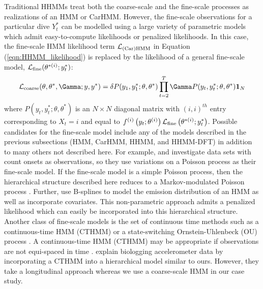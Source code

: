 Traditional HHMMs treat both the coarse-scale and the fine-scale processes as realizations of an HMM or CarHMM. 
However, the fine-scale observations for a particular dive $Y^*_t$ can be modelled using a large variety of parametric models which admit easy-to-compute likelihoods or penalized likelihoods. In this case, the fine-scale HMM likelihood term $\mathcal{L}_{\text{(Car)HMM}}$ in Equation (\ref{eqn:HHMM_likelihood}) is replaced by the likelihood of a general fine-scale model, $\mathcal{L}_{\text{fine}}(\theta^{*(i)};y^*_t)$:
\[
\calL_{\text{coarse}}(\theta,\theta^*,\Gamma;y,y^*) = \delta P(y_1,y^*_1;\theta,\theta^*) \prod_{t=2}^T \Gamma P(y_t,y^*_t;\theta,\theta^*) \mathbf{1}_N
\]
where $P(y_t,y^*_t;\theta,\theta^*) $ is an $N \times N$ diagonal matrix with $(i,i)^{th}$ entry corresponding to $X_t=i$ and equal to $f^{(i)}\left(y_t;\theta^{(i)}\right)\mathcal{L}_{\text{fine}}\left(\theta^{*(i)};y^*_t\right)$. 
%
Possible candidates for the fine-scale model include any of the models described in the previous subsections (HMM, CarHMM, HHMM, and HHMM-DFT) in addition to many others not described here. For example, \citet{Bebbington:2007} and \citet{Borchers:2013} investigate data sets with count onsets as observations, so they use variations on a Poisson process as their fine-scale model. If the fine-scale model is a simple Poisson process, then the hierarchical structure described here reduces to a Markov-modulated Poisson process \citep{Fischer:1993}.
Further, \citep{Langrock:2018} use B-splines to model the emission distribution of an HMM as well as incorporate covariates. This non-parametric approach admits a penalized likelihood which can easily be incorporated into this hierarchical structure. 
Another class of fine-scale models is the set of continuous time methods such as a continuous-time HMM (CTHMM) \citep{Liu:2015} or a state-switching Ornstein-Uhlenbeck (OU) process \citep{Michelot:2019}. 
A continuous-time HMM (CTHMM) may be appropriate if observations are not equi-spaced in time \citep{Liu:2015}. \citet{Xu:2018} explain biologging accelerometer data by incorporating a CTHMM into a hierarchical model similar to ours. However, they take a longitudinal approach whereas we use a coarse-scale HMM in our case study.

